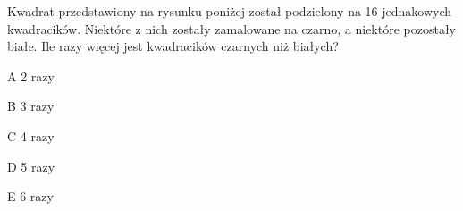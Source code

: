 \begin{tresc}
Kwadrat przedstawiony na rysunku poniżej został podzielony na 16 jednakowych kwadracików. Niektóre z nich zostały zamalowane na czarno, a niektóre pozostały białe. Ile razy więcej jest kwadracików czarnych niż białych?
\end{tresc}
\begin{wariant}{A} 2 razy \end{wariant}
\begin{wariant}{B} 3 razy \end{wariant}
\begin{wariant}{C} 4 razy \end{wariant}
\begin{wariant}{D} 5 razy \end{wariant}
\begin{wariant}{E} 6 razy \end{wariant}
